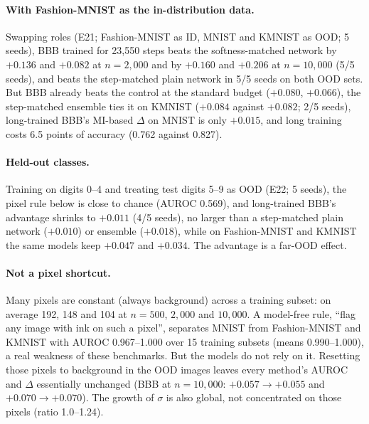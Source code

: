 \documentclass[11pt]{article}
\begin{document}
\paragraph{With Fashion-MNIST as the in-distribution data.} Swapping roles
(E21; Fashion-MNIST as ID, MNIST and KMNIST as OOD; 5 seeds), BBB trained for
23{,}550 steps beats the softness-matched network by $+0.136$ and $+0.082$ at
$n=2{,}000$ and by $+0.160$ and $+0.206$ at $n=10{,}000$ (5/5 seeds), and beats the
step-matched plain network in 5/5 seeds on both OOD sets. But BBB already beats
the control at the standard budget ($+0.080$, $+0.066$), the step-matched
ensemble ties it on KMNIST ($+0.084$ against $+0.082$; 2/5 seeds), long-trained
BBB's MI-based $\Delta$ on MNIST is only $+0.015$, and long training costs 6.5
points of accuracy (0.762 against 0.827).

\paragraph{Held-out classes.} Training on digits 0--4 and treating test
digits 5--9 as OOD (E22; 5 seeds), the pixel rule below is close to chance
(AUROC 0.569), and long-trained BBB's advantage shrinks to $+0.011$ (4/5 seeds),
no larger than a step-matched plain network ($+0.010$) or ensemble ($+0.018$),
while on Fashion-MNIST and KMNIST the same models keep $+0.047$ and $+0.034$.
The advantage is a far-OOD effect.

\paragraph{Not a pixel shortcut.} Many pixels are constant (always
background) across a training subset: on average 192, 148 and 104 at
$n=500$, $2{,}000$ and $10{,}000$. A model-free rule, ``flag
any image with ink on such a pixel'', separates MNIST from Fashion-MNIST and
KMNIST with AUROC 0.967--1.000 over 15 training subsets (means
0.990--1.000), a real weakness of these benchmarks. But the
models do not rely on it. Resetting those pixels to background in the OOD
images leaves every method's AUROC and $\Delta$ essentially unchanged (BBB at
$n=10{,}000$: $+0.057\to+0.055$ and $+0.070\to+0.070$). The growth of
$\sigma$ is also global, not concentrated on those pixels (ratio 1.0--1.24).
\end{document}
